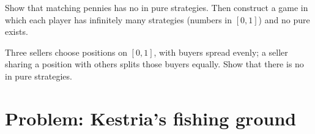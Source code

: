 \begin{exercise}[$\star\star\star$]\label{exo:b2:static-games:11}
Show that matching pennies has no  in pure strategies. Then construct a game in which each
player has infinitely many strategies (numbers in $[0, 1]$) and no pure  exists.
\end{exercise}

\begin{exercise}[$\star\star\star$]\label{exo:b2:static-games:12}
Three sellers choose positions on $[0, 1]$, with buyers spread evenly; a seller sharing a position with others
splits those buyers equally. Show that there is no  in pure strategies.
\end{exercise}

\section{Problem: Kestria's fishing ground}\label{sec:b2:static-games:problem}

